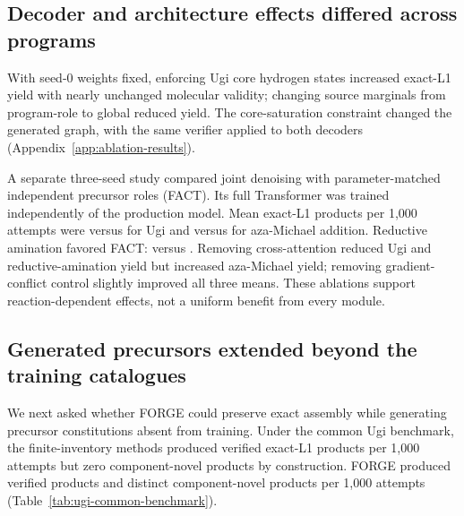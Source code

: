 \subsection{Decoder and architecture effects differed across programs}
With seed-0 weights fixed, enforcing Ugi core hydrogen states increased exact-L1 yield with nearly
unchanged molecular validity; changing source marginals from program-role to global reduced yield.
The core-saturation constraint changed the generated graph, with the same verifier applied to both
decoders (Appendix~\ref{app:ablation-results}).

A separate three-seed study compared joint denoising with parameter-matched independent precursor
roles (FACT). Its full Transformer was trained independently of the production model. Mean exact-L1
products per 1,000 attempts were \ForgeProseMechanismFullUgi{} versus
\ForgeProseMechanismFactMatchedUgi{} for Ugi and \ForgeProseMechanismFullBL{} versus
\ForgeProseMechanismFactMatchedBL{} for aza-Michael addition. Reductive amination favored FACT:
\ForgeProseMechanismFullLX{} versus \ForgeProseMechanismFactMatchedLX{}. Removing cross-attention reduced Ugi and reductive-amination yield but
increased aza-Michael yield; removing gradient-conflict control slightly improved all three means.
These ablations support reaction-dependent effects, not a uniform benefit from every module.

\subsection{Generated precursors extended beyond the training catalogues}
We next asked whether FORGE could preserve exact assembly while generating precursor constitutions
absent from training. Under the common Ugi benchmark, the finite-inventory methods produced
\ForgeProseCommonSelectorExactPerThousand{} verified exact-L1 products per 1,000 attempts but zero
component-novel products by construction. FORGE produced
\ForgeProseCommonForgeExactPerThousand{} verified products and
\ForgeProseCommonForgeDistinctPerThousand{} distinct component-novel products per 1,000 attempts
(Table~\ref{tab:ugi-common-benchmark}).

